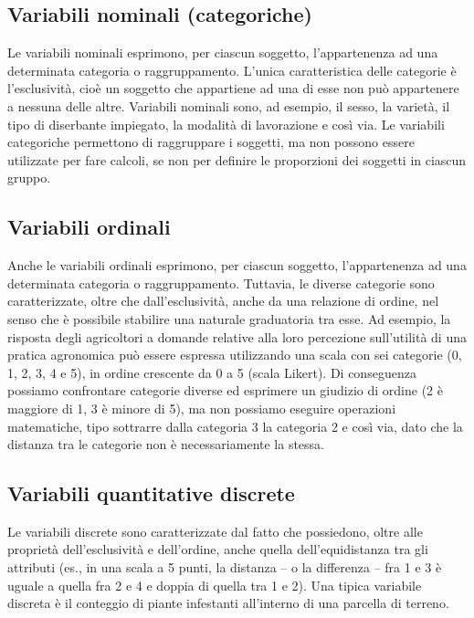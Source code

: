 \documentclass[a4paper,12pt,oneside]{book}
\theoremstyle{definition}
\theoremstyle{definition}
\theoremstyle{definition}
\theoremstyle{remark}
\begin{document}
\subsection{Variabili nominali
(categoriche)}\label{variabili-nominali-categoriche}

Le variabili nominali esprimono, per ciascun soggetto, l'appartenenza ad
una determinata categoria o raggruppamento. L'unica caratteristica delle
categorie è l'esclusività, cioè un soggetto che appartiene ad una di
esse non può appartenere a nessuna delle altre. Variabili nominali sono,
ad esempio, il sesso, la varietà, il tipo di diserbante impiegato, la
modalità di lavorazione e così via. Le variabili categoriche permettono
di raggruppare i soggetti, ma non possono essere utilizzate per fare
calcoli, se non per definire le proporzioni dei soggetti in ciascun
gruppo.

\subsection{Variabili ordinali}\label{variabili-ordinali}

Anche le variabili ordinali esprimono, per ciascun soggetto,
l'appartenenza ad una determinata categoria o raggruppamento. Tuttavia,
le diverse categorie sono caratterizzate, oltre che dall'esclusività,
anche da una relazione di ordine, nel senso che è possibile stabilire
una naturale graduatoria tra esse. Ad esempio, la risposta degli
agricoltori a domande relative alla loro percezione sull'utilità di una
pratica agronomica può essere espressa utilizzando una scala con sei
categorie (0, 1, 2, 3, 4 e 5), in ordine crescente da 0 a 5 (scala
Likert). Di conseguenza possiamo confrontare categorie diverse ed
esprimere un giudizio di ordine (2 è maggiore di 1, 3 è minore di 5), ma
non possiamo eseguire operazioni matematiche, tipo sottrarre dalla
categoria 3 la categoria 2 e così via, dato che la distanza tra le
categorie non è necessariamente la stessa.

\subsection{Variabili quantitative
discrete}\label{variabili-quantitative-discrete}

Le variabili discrete sono caratterizzate dal fatto che possiedono,
oltre alle proprietà dell'esclusività e dell'ordine, anche quella
dell'equidistanza tra gli attributi (es., in una scala a 5 punti, la
distanza -- o la differenza -- fra 1 e 3 è uguale a quella fra 2 e 4 e
doppia di quella tra 1 e 2). Una tipica variabile discreta è il
conteggio di piante infestanti all'interno di una parcella di terreno.
\end{document}
